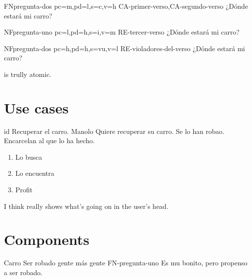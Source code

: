 \documentclass[a4paper,10pt]{article}
\begin{document}
  \begin{softwareReq}{FN}{pregunta-dos}
    {pc=m,pd=l,s=c,v=h}  %
    {CA-primer-verso,CA-segundo-verso}  %
    ¿Dónde estará mi carro?
  \end{softwareReq}



  \begin{softwareReq}{NF}{pregunta-uno}
    {pc=l,pd=h,s=i,v=m}  %
    {RE-tercer-verso}  %
    ¿Dónde estará mi carro?
  \end{softwareReq}

  \begin{softwareReq}{NF}{pregunta-dos}
    {pc=h,pd=h,s=vu,v=l}  %
    {RE-violadores-del-verso}  %
    ¿Dónde estará mi carro?
  \end{softwareReq}

  \FloatBarrier


   is trully atomic.


  \section{Use cases}

  \printuctemplate

  \begin{useCase}{id}
    {Recuperar el carro.}  %
    {Manolo}  %
    {Quiere recuperar su carro.}  %
    {Se lo han robao.}  %
    {Encarcelan al que lo ha hecho.}  %
    \begin{enumerate}  %
      \item Lo busca
      \item Lo encuentra
      \item Profit
    \end{enumerate}
  \end{useCase}

  \FloatBarrier

  I think  really shows what's going on in the user's head.



  \section{Components}

  \printcomptemplate

  \begin{component}{Carro}
    {Ser robado}  %
    {\NA}  %
    {gente}  %
    {más gente}  %
    {FN-pregunta-uno}  %
    Es mu bonito, pero propenso a ser robado.
  \end{component}
\end{document}
